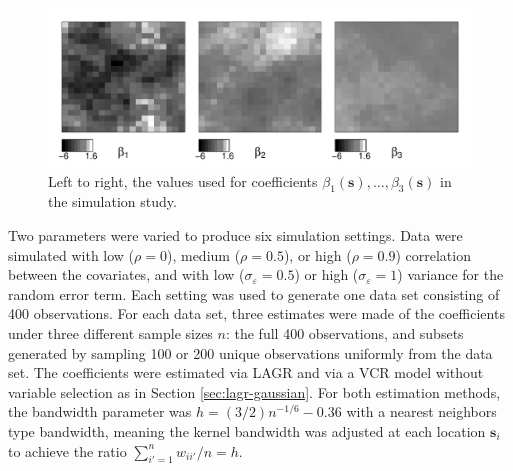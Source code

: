 \documentclass[authoryear,review, 12pt]{elsarticle}
\begin{document}
\begin{figure}
    \includegraphics[width=\textwidth]{figure/coefs.pdf}
    \caption{Left to right, the values used for coefficients $\beta_1(\bm{s}), \dots, \beta_3(\bm{s})$ in the simulation study. \label{fig:simulation-coefficients}}
\end{figure}

Two parameters were varied to produce six simulation settings.
Data were simulated with low ($\rho=0$), medium ($\rho=0.5$), or high ($\rho=0.9$)
correlation between the covariates, and with
low ($\sigma_{\varepsilon}=0.5$) or high ($\sigma_{\varepsilon}=1$)
variance for the random error term. Each setting was used to generate one data set consisting of 400 observations.
For each data set, three estimates were made of the coefficients under three different sample sizes $n$: the full 400 observations, and subsets generated by sampling 100 or 200 unique observations uniformly from the data set.
The coefficients were estimated via LAGR and via a VCR model without variable selection as in Section \ref{sec:lagr-gaussian}.
For both estimation methods, the bandwidth parameter was $h=(3/2)n^{-1/6} - 0.36$ with a nearest neighbors type bandwidth, meaning the kernel bandwidth was adjusted at each location $\bm{s}_i$ to achieve the ratio $\sum_{i'=1}^n w_{ii'}/n = h$.
\end{document}
